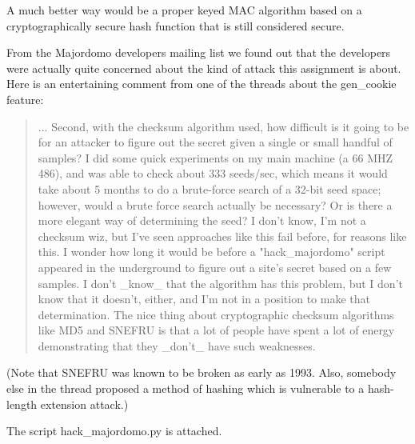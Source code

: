 \documentclass{article}
\begin{document}
A much better way would be a proper keyed MAC algorithm based on a cryptographically secure hash function that is still considered secure.

From the Majordomo developers mailing list we found out that the developers were actually quite concerned about the kind of attack this assignment is about.
Here is an entertaining comment from one of the threads about the gen\_cookie feature:
\begin{quotation}
	...
	Second, with the checksum algorithm used, how difficult is it going to be
	for an attacker to figure out the secret given a single or small handful of
	samples?  I did some quick experiments on my main machine (a 66 MHZ 486),
	and was able to check about 333 seeds/sec, which means it would take about
	5 months to do a brute-force search of a 32-bit seed space; however, would
	a brute force search actually be necessary?  Or is there a more elegant way
	of determining the seed?  I don't know, I'm not a checksum wiz, but I've
	seen approaches like this fail before, for reasons like this.  I wonder how
	long it would be before a "hack\_majordomo" script appeared in the
	underground to figure out a site's secret based on a few samples.  I don't
	\_know\_ that the algorithm has this problem, but I don't know that it
	doesn't, either, and I'm not in a position to make that determination.  The
	nice thing about cryptographic checksum algorithms like MD5 and SNEFRU is
	that a lot of people have spent a lot of energy demonstrating that they
	\_don't\_ have such weaknesses.
\end{quotation}
\cite{majordomo_thread}
(Note that SNEFRU was known to be broken as early as 1993. Also, somebody else in the thread proposed a method of hashing which is vulnerable to a hash-length extension attack.)

The script hack\_majordomo.py is attached.

\section{}



 
\end{document}
